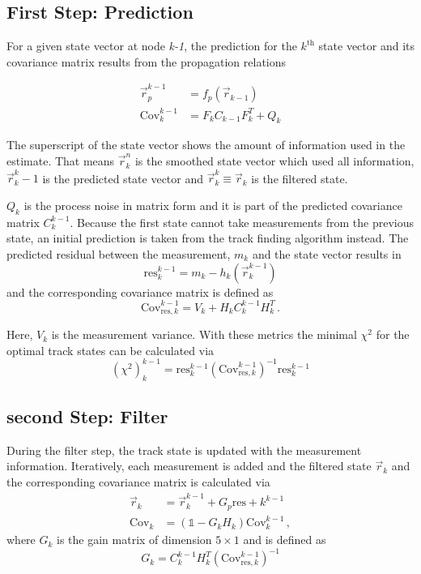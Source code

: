 \subsection{First Step: Prediction}
For a given state vector at node \textit{k-1}, the prediction for the $k^{\text{th}}$ state vector and its covariance matrix results from the propagation relations

\begin{align*}
  \vec{r}_p^{k-1} &= f_p\left( \vec{r}_{k-1} \right) \\
  \text{Cov}_k^{k-1} &= F_k C_{k-1} F_k^T + Q_k
\end{align*}

The superscript of the state vector shows the amount of information used in the estimate.
That means $\vec{r}_k^n$ is the smoothed state vector which used all information,
$\vec{r}_k^k-1$ is the predicted state vector and $\vec{r}_k^k \equiv \vec{r}_k$ is the filtered state.

$Q_k$ is the process noise in matrix form and it is part of the predicted
covariance matrix $C_k^{k-1}$.
Because the first state cannot take measurements from the previous state, an initial prediction is taken from the track finding algorithm instead.
The predicted residual between the measurement, $m_k$ and the state vector results in
\begin{equation*}
  \text{res}_k^{k-1} = m_k - h_k\left( \vec{r}_k^{k-1} \right)
\end{equation*}
and the corresponding covariance matrix is defined as
\begin{equation*}
  \text{Cov}_{\text{res},k}^{k-1} = V_k + H_k C_k^{k-1} H_k^T\,.
\end{equation*}

Here, $V_k$ is the measurement variance. With these metrics the minimal $\chi^2$ for the optimal track states can be calculated via
\begin{equation*}
  \left( \chi^2 \right)_k^{k-1} =
  \text{res}_k^{k-1} \left(\text{Cov}_{\text{res},k}^{k-1}\right)^{-1} \text{res}_k^{k-1}
\end{equation*}

\subsection{second Step: Filter}
During the filter step, the track state is updated with the measurement information.
Iteratively, each measurement is added and the filtered state $\vec{r}_k$ and the corresponding covariance matrix is calculated via
\begin{align*}
  \vec{r}_k &= \vec{r}_k^{k-1} + G_p \text{res}+k^{k-1} \\
  \text{Cov}_k &= \left(\mathbb{1} - G_k H_k\right) \text{Cov}_k^{k-1}\,,
\end{align*}
where $G_k$ is the gain matrix of dimension $5\times1$ and is defined as
\begin{equation*}
  G_k = C_k^{k-1} H_k^T \left( \text{Cov}_{\text{res},k}^{k-1} \right)^{-1}
\end{equation*}

